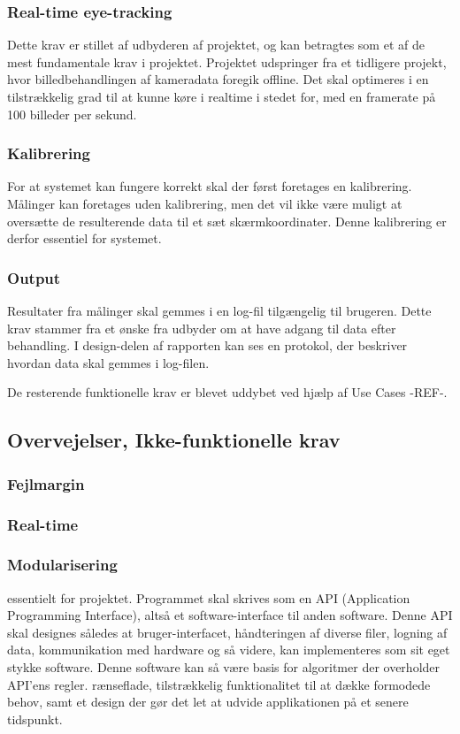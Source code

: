 \documentclass[rapport.tex]{subfiles}
\begin{document}
	\subsubsection{Real-time eye-tracking}
	Dette krav er stillet af udbyderen af projektet, og kan betragtes som et af de mest fundamentale krav i projektet. Projektet udspringer fra et tidligere projekt, hvor billedbehandlingen af kameradata foregik offline. Det skal optimeres i en tilstrækkelig grad til at kunne køre i realtime i stedet for, med en framerate på 100 billeder per sekund.
	
	\subsubsection{Kalibrering}
	For at systemet kan fungere korrekt skal der først foretages en kalibrering. Målinger kan foretages uden kalibrering, men det vil ikke være muligt at oversætte de resulterende data til et sæt skærmkoordinater. Denne kalibrering er derfor essentiel for systemet.
	
	\subsubsection{Output}
	Resultater fra målinger skal gemmes i en log-fil tilgængelig til brugeren. Dette krav stammer fra et ønske fra udbyder om at have adgang til data efter behandling. I
	design-delen af rapporten kan ses en protokol, der beskriver hvordan data skal gemmes i log-filen. 
	
	
	
	De resterende funktionelle krav er blevet uddybet ved hjælp af Use Cases -REF-.
	
	
	\subsection{Overvejelser, Ikke-funktionelle krav}
	
	\subsubsection{Fejlmargin}
	
	
	
	\subsubsection{Real-time}
	
	
	
	\subsubsection{Modularisering}
	essentielt for projektet. Programmet skal skrives som en API (Application Programming Interface), altså et software-interface til anden software. Denne API skal designes således at bruger-interfacet, håndteringen af diverse filer, logning af data, kommunikation med hardware og så videre, kan implementeres som sit eget stykke software. Denne software kan så være basis for algoritmer der overholder API'ens regler. 
	rænseflade, tilstrækkelig
	funktionalitet til at dække formodede behov, samt et design der gør det let at udvide
	applikationen på et senere tidspunkt.
	
\end{document}
